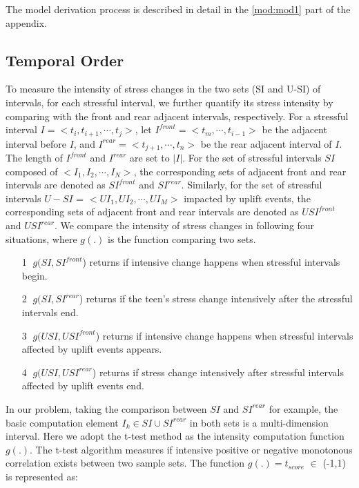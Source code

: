 The model derivation process is described in detail in the \ref{mod:mod1} part of the appendix. 

\subsection{Temporal Order}
\label{sec:temporal}
To measure the intensity of stress changes in the two sets (SI and U-SI) of intervals,
for each stressful interval,
we further quantify its stress intensity by comparing with the front and rear adjacent intervals, respectively.
For a stressful interval $I = <t_i,t_{i+1},\cdots,t_j>$,
let $I^{front} = <t_m,\cdots,t_{i-1}>$ be the adjacent interval before $I$,
and $I^{rear} = <t_{j+1},\cdots,t_n>$ be the rear adjacent interval of $I$.
The length of $I^{front}$ and $I^{rear}$ are set to $|I|$.
For the set of stressful intervals $SI$ composed of $<I_1,I_2,\cdots,I_N>$,
the corresponding sets of adjacent front and rear intervals are denoted as $SI^{front}$ and $SI^{rear}$.
Similarly, for the set of stressful intervals $U-SI$ = $<UI_1,UI_2,\cdots, UI_M>$ impacted by uplift events,
the corresponding sets of adjacent front and rear intervals are denoted as $USI^{front}$ and $USI^{rear}$.
We compare the intensity of stress changes in following four situations,
where $g(.)$ is the function comparing two sets.

\begin{itemize}
\item[\textcircled{1}] $g(SI,SI^{front}$) returns if intensive change happens when stressful intervals begin.
\item[\textcircled{2}] $g(SI,SI^{rear}$) returns if the teen's stress change intensively after the stressful intervals end.
\item[\textcircled{3}] $g(USI,USI^{front}$) returns if intensive change happens when stressful intervals affected by uplift events appears.
\item[\textcircled{4}] $g(USI,USI^{rear}$) returns if stress change intensively after stressful intervals affected by uplift events end.
\end{itemize}

In our problem, taking the comparison between $SI$ and $SI^{rear}$ for example,
the basic computation element $I_k \in SI \cup SI^{rear}$ in both sets is a multi-dimension interval.
Here we adopt the t-test method as the intensity computation function $g(.)$.
The t-test algorithm measures if intensive positive or negative monotonous correlation
exists between two sample sets.
The function $g(.) = t_{score}$ $\in$ (-1,1) is represented as:

